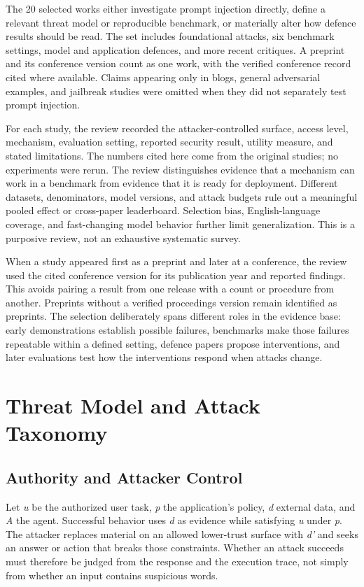 \documentclass[conference]{IEEEtran}
\begin{document}
The 20 selected works either investigate prompt injection directly, define a relevant threat model or reproducible benchmark, or materially alter how defence results should be read. The set includes foundational attacks, six benchmark settings, model and application defences, and more recent critiques. A preprint and its conference version count as one work, with the verified conference record cited where available. Claims appearing only in blogs, general adversarial examples, and jailbreak studies were omitted when they did not separately test prompt injection.

For each study, the review recorded the attacker-controlled surface, access level, mechanism, evaluation setting, reported security result, utility measure, and stated limitations. The numbers cited here come from the original studies; no experiments were rerun. The review distinguishes evidence that a mechanism can work in a benchmark from evidence that it is ready for deployment. Different datasets, denominators, model versions, and attack budgets rule out a meaningful pooled effect or cross-paper leaderboard. Selection bias, English-language coverage, and fast-changing model behavior further limit generalization. This is a purposive review, not an exhaustive systematic survey.

When a study appeared first as a preprint and later at a conference, the review used the cited conference version for its publication year and reported findings. This avoids pairing a result from one release with a count or procedure from another. Preprints without a verified proceedings version remain identified as preprints. The selection deliberately spans different roles in the evidence base: early demonstrations establish possible failures, benchmarks make those failures repeatable within a defined setting, defence papers propose interventions, and later evaluations test how the interventions respond when attacks change.

\section{Threat Model and Attack Taxonomy}
\subsection{Authority and Attacker Control}
Let \emph{u} be the authorized user task, \emph{p} the application's policy, \emph{d} external data, and \emph{A} the agent. Successful behavior uses \emph{d} as evidence while satisfying \emph{u} under \emph{p}. The attacker replaces material on an allowed lower-trust surface with \emph{d'} and seeks an answer or action that breaks those constraints. Whether an attack succeeds must therefore be judged from the response and the execution trace, not simply from whether an input contains suspicious words.
\end{document}
